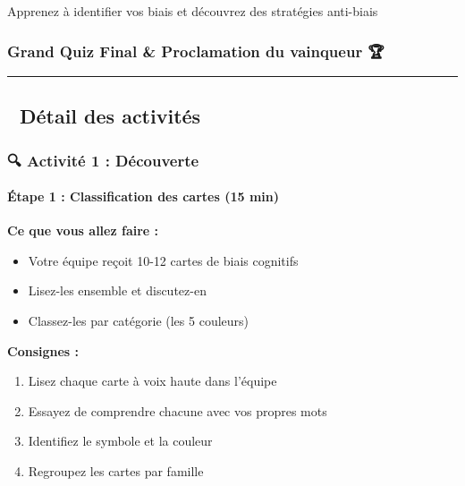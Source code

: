 \documentclass[
]{article}
\providecommand{\tightlist}{%
  \setlength{\itemsep}{0pt}\setlength{\parskip}{0pt}}
\begin{document}
Apprenez à identifier vos biais et découvrez des stratégies anti-biais

\subsubsection{\texorpdfstring{\textbf{Grand Quiz Final \& Proclamation
du vainqueur
🏆}}{Grand Quiz Final \& Proclamation du vainqueur 🏆}}\label{grand-quiz-final-proclamation-du-vainqueur}

\begin{center}\rule{0.5\linewidth}{0.5pt}\end{center}

\subsection{🎲 Détail des activités}\label{duxe9tail-des-activituxe9s}

\subsubsection{🔍 Activité 1 :
Découverte}\label{activituxe9-1-duxe9couverte}

\paragraph{\texorpdfstring{\textbf{Étape 1 : Classification des cartes
(15
min)}}{Étape 1 : Classification des cartes (15 min)}}\label{uxe9tape-1-classification-des-cartes-15-min}

\textbf{Ce que vous allez faire :}

\begin{itemize}
\tightlist
\item
  Votre équipe reçoit 10-12 cartes de biais cognitifs
\item
  Lisez-les ensemble et discutez-en
\item
  Classez-les par catégorie (les 5 couleurs)
\end{itemize}

\textbf{Consignes :}

\begin{enumerate}
\def\labelenumi{\arabic{enumi}.}
\tightlist
\item
  Lisez chaque carte à voix haute dans l'équipe
\item
  Essayez de comprendre chacune avec vos propres mots
\item
  Identifiez le symbole et la couleur
\item
  Regroupez les cartes par famille
\end{enumerate}
\end{document}

